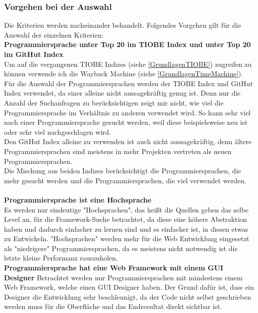 \documentclass[ngerman]{article}
\begin{document}
    \subsubsection{Vorgehen bei der Auswahl}
    Die Kriterien werden nacheinander behandelt. Folgendes Vorgehen gilt für die Auswahl der einzelnen Kriterien:\\
    \textbf{Programmiersprache unter Top 20 im TIOBE Index und unter Top 20 im GitHut Index}\\
    Um auf die vergangenen TIOBE Indizes (siehe \ref{GrundlagenTIOBE}) zugreifen zu können verwende ich die Wayback Machine (siehe \ref{GrundlagenTimeMachine}).\\
    Für die Auswahl der Programmiersprachen werden der TIOBE Index und GitHut Index verwendet, da einer alleine nicht aussagekräftig genug ist. Denn nur die Anzahl der Suchanfragen zu berücksichtigen zeigt mir nicht, wie viel die Programmiersprache im Verhältnis zu anderen verwendet wird. So kann sehr viel nach einer Programmiersprache gesucht werden, weil diese beispielsweise neu ist oder sehr viel nachgeschlagen wird.\\
    Den GitHut Index alleine zu verwenden ist auch nicht aussagekräftig, denn ältere Programmiersprachen sind meistens in mehr Projekten vertreten als neuen Programmiersprachen.\\
    Die Mischung aus beiden Indizes berücksichtigt die Programmiersprachen, die mehr gesucht werden und die Programmiersprachen, die viel verwendet werden.\\\\
    \textbf{Programmiersprache ist eine Hochsprache}\\
    Es werden nur eindeutige "Hochsprachen", das heißt die Quellen geben das selbe Level an, für die Framework-Suche betrachtet, da diese eine höhere Abstraktion haben und dadurch einfacher zu lernen sind und es einfacher ist, in diesen etwas zu Entwickeln. "Hochsprachen" werden mehr für die Web Entwicklung eingesetzt als "niedrigere" Programmiersprachen, da es meistens nicht notwendig ist die letzte kleine Performanz rauszuholen. \cite{High level Low level languages}\\
    \textbf{Programmiersprache hat eine Web Framework mit einem GUI Designer}
    Betrachtet werden nur Programmiersprachen mit mindestens einem Web Framework, welche einen GUI Designer haben. Der Grund dafür ist, dass ein Designer die Entwicklung sehr beschleunigt, da der Code nicht selbst geschrieben werden muss für die Oberfläche und das Endresultat direkt sichtbar ist.
\end{document}
